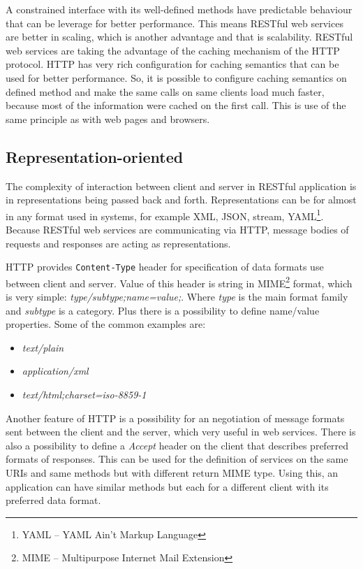 \documentclass[12pt,final,oneside]{fithesis2}
\begin{document}
A constrained interface with its well-defined methods have predictable behaviour that can be leverage for better performance. This means RESTful web services are better in scaling, which is another advantage and that is scalability. RESTful web services are taking the advantage of the caching mechanism of the HTTP protocol. HTTP has very rich configuration for caching semantics that can be used for better performance. So, it is possible to configure caching semantics on defined method and make the same calls on same clients load much faster, because most of the information were cached on the first call. This is use of the same principle as with web pages and browsers. 

\subsection*{Representation-oriented}
The complexity of interaction between client and server in RESTful application is in representations being passed back and forth. Representations can be for almost in any format used in systems, for example XML, JSON, stream, YAML\footnote{YAML -- YAML Ain't Markup Language}. Because RESTful web services are communicating via HTTP, message bodies of requests and responses are acting as representations.

HTTP provides \texttt{Content-Type} header for specification of data formats use between client and server. Value of this header is string in MIME\footnote{MIME -- Multipurpose Internet Mail Extension} format, which is very simple: \textit{type/subtype;name=value;}. Where \textit{type} is the main format family and \textit{subtype} is a category. Plus there is a possibility to define name/value properties. Some of the common examples are:

\begin{itemize}
\item
\textit{text/plain}

\item
\textit{application/xml}

\item
\textit{text/html;charset=iso-8859-1}
\end{itemize}

Another feature of HTTP is a possibility for an negotiation of message formats sent between the client and the server, which very useful in web services. There is also a possibility to define a \textit{Accept} header on the client that describes preferred formats of responses. This can be used for the definition of services on the same URIs and same methods but with different return MIME type. Using this, an application can have similar methods but each for a different client with its preferred data format.
\end{document}
